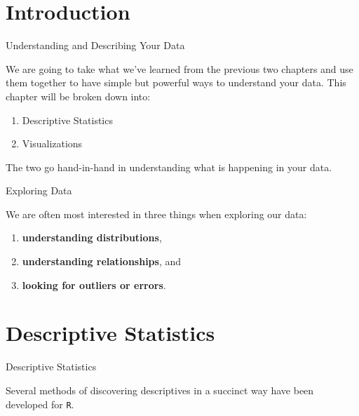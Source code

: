 \section{Introduction}\label{introduction}

\begin{frame}{Understanding and Describing Your Data}

We are going to take what we've learned from the previous two chapters
and use them together to have simple but powerful ways to understand
your data. This chapter will be broken down into:

\begin{enumerate}
\def\labelenumi{\arabic{enumi}.}
\tightlist
\item
  Descriptive Statistics
\item
  Visualizations
\end{enumerate}

The two go hand-in-hand in understanding what is happening in your data.

\end{frame}

\begin{frame}{Exploring Data}

We are often most interested in three things when exploring our data:

\begin{enumerate}
\def\labelenumi{\arabic{enumi}.}
\tightlist
\item
  \textbf{understanding distributions},
\item
  \textbf{understanding relationships}, and
\item
  \textbf{looking for outliers or errors}.
\end{enumerate}

\end{frame}

\section{Descriptive Statistics}\label{descriptive-statistics}

\begin{frame}[fragile]{Descriptive Statistics}

Several methods of discovering descriptives in a succinct way have been
developed for \texttt{R}.


\end{frame}

